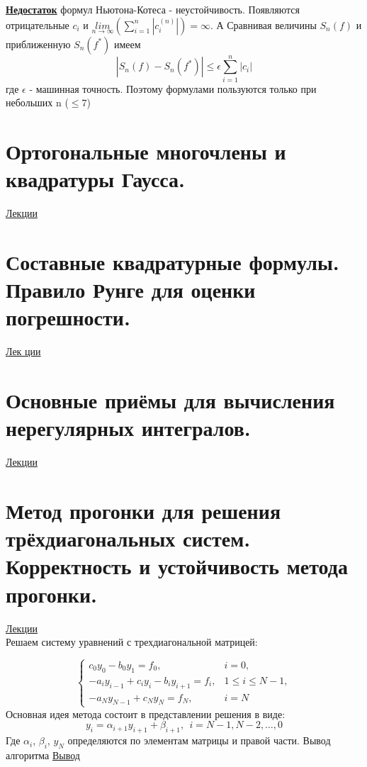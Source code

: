 \documentclass[specialist, subf, href, colorlinks=true, 12pt, times, mtpro, final]{disser}
\theoremstyle{definition}
\begin{document}
	\textbf{\hyperlink {lects.39}{Недостаток}} формул Ньютона-Котеса - неустойчивость. Появляются отрицательные $c_i$ и $\underset{n\rightarrow \infty}{lim} \left(\sum\limits_{i=1}^n |c_i^{(n)}| \right) = \infty$. А Сравнивая величины $S_n(f)$ и приближенную $S_n(f^*)$ имеем 
	$$
		|S_n(f) - S_n(f^*)| \le \epsilon \sum\limits_{i = 1}^n |c_i|
	$$
	где $\epsilon$ - машинная точность. Поэтому формулами пользуются только при небольших n ($\le7$)

\section {Ортогональные многочлены и квадратуры Гаусса.}
	\hyperlink {lects.40}{Лекции}\\
	

\section {Составные квадратурные формулы. Правило Рунге для оценки погрешности.}
	\hyperlink {lects.44}{Лек ции}\\

\section {Основные приёмы для вычисления нерегулярных интегралов.}
	\hyperlink {lects.45}{Лекции}\\

\section {Метод прогонки для решения трёхдиагональных систем. Корректность и устойчивость метода прогонки.}
	\hyperlink {lects.48}{Лекции}\\
	Решаем систему уравнений с трехдиагональной матрицей:
	
	\begin{equation*}
	 \begin{cases}
	   c_0 y_0 - b_0 y_1 = f_0, &i = 0,\\
	   -a_i y_{i-1} + c_i y_i - b_i y_{i+1} = f_i, &1 \le i \le N-1, \\
	   -a_N y_{N-1} + c_N y_N = f_N, & i = N
	 \end{cases}
	\end{equation*}
	Основная идея метода состоит в представлении решения в виде:
	$$y_i = \alpha_{i+1} y_{i+1} + \beta_{i+1}, \ \ i = N-1, N-2, \dots , 0$$
	Где $\alpha_i$, $\beta_i$, $y_N$ определяются по элементам матрицы и правой части.
	Вывод алгоритма \hyperlink {lects.48}{Вывод}
	
\end{document}
